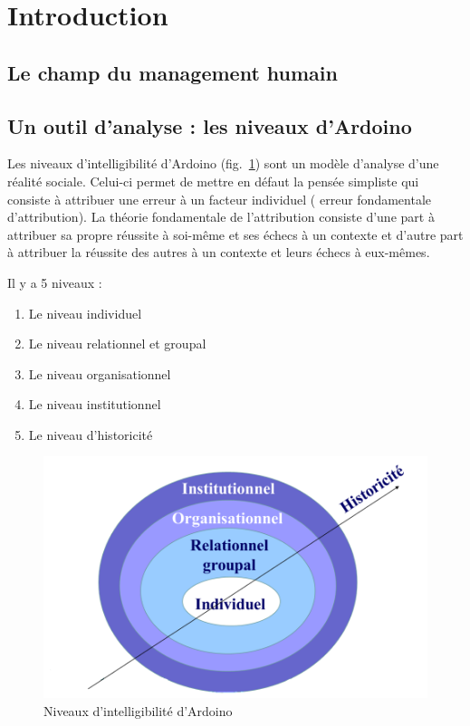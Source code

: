\documentclass[12pt]{article}
\begin{document}
\section{Introduction}
  \subsection{Le champ du management humain}
  \subsection{Un outil d'analyse : les niveaux d'Ardoino}
  Les niveaux d'intelligibilité d'Ardoino (fig.~\ref{niveau_ardoino}) sont un modèle d'analyse d'une réalité sociale. Celui-ci permet de mettre en défaut la pensée simpliste qui consiste à attribuer une erreur à un facteur individuel (\og{} erreur fondamentale d'attribution\fg{}). La théorie fondamentale de l'attribution consiste d'une part à attribuer sa propre réussite à soi-même et ses échecs à un contexte et d'autre part à attribuer la réussite des autres à un contexte et leurs échecs à eux-mêmes.
  
  Il y a 5 niveaux :
  
  \begin{enumerate}
   \item Le niveau individuel
   \item Le niveau relationnel et groupal
   \item Le niveau organisationnel
   \item Le niveau institutionnel
   \item Le niveau d'historicité
  \end{enumerate}
  
  \begin{figure}[h]
  	\begin{center}
  	\includegraphics[scale=0.5]{niveau_ardoino}
  	\caption{Niveaux d'intelligibilité d'Ardoino}
  	\label{niveau_ardoino}
   	\end{center}
  \end{figure}
  
\end{document}
